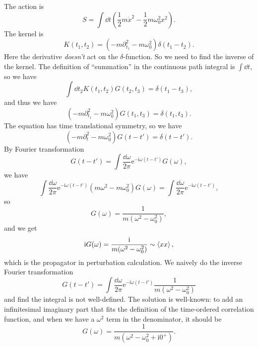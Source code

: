 \documentclass[hyperref, a4paper]{article}
\newcommand*{\ii}{\mathrm{i}}
\newcommand*{\ee}{\mathrm{e}}
\begin{document}
The action is 
\begin{equation}
    S = \int \dd{t} \left( \frac{1}{2} m \dot{x}^2 - \frac{1}{2} m \omega_0^2 x^2 \right).
\end{equation}
The kernel is 
\begin{equation}
    K(t_1, t_2) = (- m \partial_{t_1}^2 - m \omega_0^2) \delta(t_1 - t_2).
\end{equation}
Here the derivative \emph{doesn't} act on the $\delta$-function.
So we need to find the inverse of the kernel.
The definition of ``summation'' in the continuous path integral is $\int \dd{t}$,
so we have 
\begin{equation}
    \int \dd{t_2} K(t_1, t_2) G(t_2, t_3) = \delta(t_1 - t_3),
\end{equation}
and thus we have 
\[
    (-m \partial^2_{t_1} - m \omega_0^2) G(t_1, t_3) = \delta(t_1, t_3).
\]
The equation has time translational symmetry,
so we have 
\begin{equation}
    (-m \partial_t^2 - m \omega_0^2) G(t - t') = \delta(t - t').
\end{equation}
By Fourier transformation 
\begin{equation}
    G(t - t') = \int \frac{\dd \omega}{2\pi} \ee^{- \ii \omega (t - t')} G(\omega),
\end{equation}
we have 
\[
    \int \frac{\dd{\omega}}{2\pi} \ee^{- \ii \omega (t - t')} (m \omega^2 - m \omega_0^2) G(\omega) 
    = \int \frac{\dd{\omega}}{2\pi} \ee^{- \ii \omega (t - t')},
\]
so 
\begin{equation}
    G(\omega) = \frac{1}{m (\omega^2 - \omega_0^2)},
\end{equation}
and we get 
\begin{equation}
    \ii G (\omega) = \frac{\ii}{m (\omega^2 - \omega_0^2)} \sim \expval{x x},
\end{equation}
which is the propagator in perturbation calculation.
We naively do the inverse Fourier transformation 
\begin{equation}
    G(t - t') = \int \frac{\dd{\omega}}{2\pi} \ee^{- \ii \omega (t - t')} \frac{1}{m (\omega^2 - \omega_0^2)}
\end{equation}
and find the integral is not well-defined.
The solution is well-known:
to add an infinitesimal imaginary part that fits the definition of the time-ordered correlation function,
and when we have a $\omega^2$ term in the denominator, 
it should be 
\begin{equation}
    G(\omega) = \frac{1}{m (\omega^2 - \omega_0^2 + \ii 0^+)}.
    \label{eq:g-omega-0-plus}
\end{equation}
\end{document}
